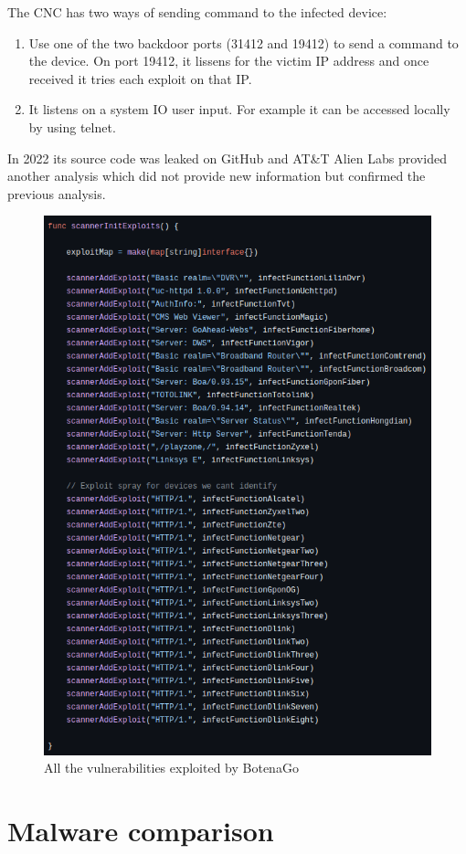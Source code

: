 The CNC has two ways of sending command to the infected device:

\begin{enumerate}
    \item Use one of the two backdoor ports (31412 and 19412) to send a command to the device. On port 19412, it lissens for the victim IP address and once received it tries each exploit on that IP.
    \item It listens on a system IO user input. For example it can be accessed locally by using telnet. 
\end{enumerate}

In 2022 its source code was leaked on GitHub and AT\&T Alien Labs provided another analysis which did not provide new information but confirmed the previous analysis. \cite{att-botenago-reverse,att-botenago-sourcecode}

\begin{figure}[ht]
    \centering
    \includegraphics[scale=0.5]{resources/images/all-vulnerabilities-botenago.png}
    \caption{All the vulnerabilities exploited by BotenaGo}
    \label{fig:all-vulnerabilities-botenago}
\end{figure}

\section{Malware comparison}

